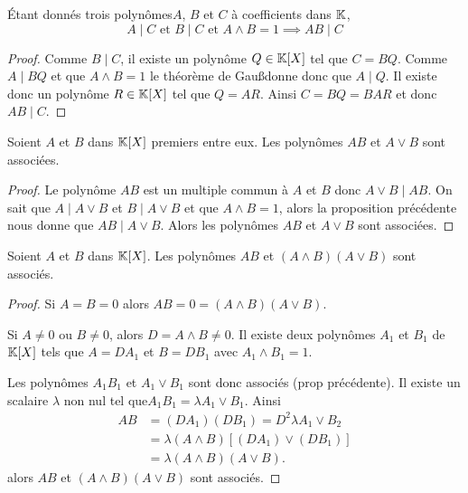 \begin{prop}
  Étant donnés trois polynômes\( A\), \(B\) et \(C\) à coefficients dans \(\mathbb{K}\),
  \begin{equation}
    A\mid{}C \text{~et~} B\mid{}C \text{~et~} A\wedge B=1 \implies AB\mid{}C
  \end{equation}
\end{prop}
\begin{proof}
  Comme \(B\mid{}C\), il existe un polynôme \(Q \in \mathbb{K}[X]\) tel que \(C=BQ\). Comme \(A\mid{}BQ\) et que \(A\wedge B=1\) le théorème de Gau\ss donne donc que \(A\mid{}Q\). Il existe donc un polynôme \(R \in \mathbb{K}[X]\) tel que \(Q=AR\). Ainsi \(C=BQ=BAR\) et donc \(AB\mid{}C\).
\end{proof}

\begin{prop}
  Soient \(A\) et \(B\) dans \(\mathbb{K}[X]\) premiers entre eux. Les polynômes \(AB\) et \(A \vee B\) sont associées.
\end{prop}
\begin{proof}
  Le polynôme \(AB\) est un multiple commun à \(A\) et \(B\) donc \(A\vee B \mid{} AB\). On sait que \(A\mid{}A \vee B\) et \(B\mid{} A\vee B\) et que \(A \wedge B=1\), alors la proposition précédente nous donne que \(AB\mid{}A \vee B\). Alors les polynômes \(AB\) et \(A \vee B\) sont associées.
\end{proof}

\begin{prop}
  Soient \(A\) et \(B\) dans \(\mathbb{K}[X]\). Les polynômes \(AB\) et \((A\wedge B)(A \vee B)\) sont associés.
\end{prop}
\begin{proof}
  Si \(A=B=0\) alors \(AB=0=(A\wedge B)(A \vee B)\).

  Si \(A\neq 0\) ou \(B\neq 0\), alors \(D=A \wedge B \neq 0\). Il existe deux polynômes \(A_1\) et \(B_1\) de \(\mathbb{K}[X]\) tels que \(A=DA_1\) et \(B=DB_1\) avec \(A_1 \wedge B_1 =1\).

  Les polynômes \(A_1B_1\) et \(A_1 \vee B_1\) sont donc associés (prop précédente). Il existe un scalaire \(\lambda\) non nul tel que\( A_1B_1= \lambda A_1 \vee B_1\). Ainsi
  \begin{align}
    AB&=(DA_1)(DB_1) = D^2 \lambda A_1 \vee B_2 \\
    &=\lambda (A \wedge B) [(DA_1) \vee (DB_1)]\\
    &=\lambda (A \wedge B)(A \vee B).
  \end{align}
  alors \(AB\) et \((A\wedge B)(A \vee B)\) sont associés.
\end{proof}

